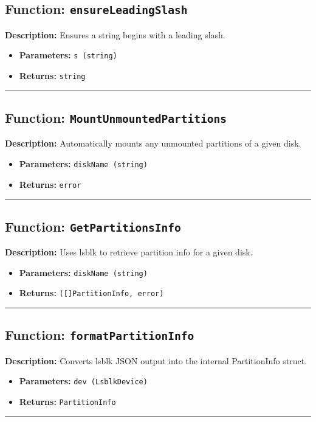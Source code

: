 \documentclass[12pt,a4paper]{article}
\begin{document}
\subsection*{Function: \texttt{ensureLeadingSlash}}
\textbf{Description:} Ensures a string begins with a leading slash.
\begin{itemize}[leftmargin=2cm,label={--}]
  \item \textbf{Parameters:} \texttt{s (string)}
  \item \textbf{Returns:} \texttt{string}
\end{itemize}
\hrule\vspace{1em}

\subsection*{Function: \texttt{MountUnmountedPartitions}}
\textbf{Description:} Automatically mounts any unmounted partitions of a given disk.
\begin{itemize}[leftmargin=2cm,label={--}]
  \item \textbf{Parameters:} \texttt{diskName (string)}
  \item \textbf{Returns:} \texttt{error}
\end{itemize}
\hrule\vspace{1em}

\subsection*{Function: \texttt{GetPartitionsInfo}}
\textbf{Description:} Uses lsblk to retrieve partition info for a given disk.
\begin{itemize}[leftmargin=2cm,label={--}]
  \item \textbf{Parameters:} \texttt{diskName (string)}
  \item \textbf{Returns:} \texttt{([]PartitionInfo, error)}
\end{itemize}
\hrule\vspace{1em}

\subsection*{Function: \texttt{formatPartitionInfo}}
\textbf{Description:} Converts lsblk JSON output into the internal PartitionInfo struct.
\begin{itemize}[leftmargin=2cm,label={--}]
  \item \textbf{Parameters:} \texttt{dev (LsblkDevice)}
  \item \textbf{Returns:} \texttt{PartitionInfo}
\end{itemize}
\hrule\vspace{1em}
\end{document}
